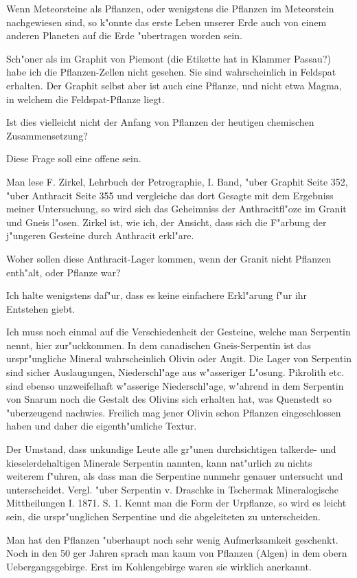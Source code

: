 \documentclass[a4paper, 11pt, oneside, german]{article}
\begin{document}
Wenn Meteorsteine als Pflanzen, oder wenigstens die Pflanzen im Meteorstein nachgewiesen sind, so k"onnte das erste Leben unserer Erde auch von einem anderen Planeten auf die Erde "ubertragen worden sein.

Sch"oner als im Graphit von Piemont (die Etikette hat in Klammer Passau?) habe ich die Pflanzen-Zellen nicht gesehen. Sie sind wahrscheinlich in Feldspat erhalten. Der Graphit selbst aber ist auch eine Pflanze, und nicht etwa Magma, in welchem die Feldspat-Pflanze liegt.

Ist dies vielleicht nicht der Anfang von Pflanzen der heutigen chemischen Zusammensetzung?

Diese Frage soll eine offene sein.

Man lese F. Zirkel, Lehrbuch der Petrographie, I. Band, "uber Graphit Seite 352, "uber Anthracit Seite 355 und vergleiche das dort Gesagte mit dem Ergebniss meiner Untersuchung, so wird sich das Geheimniss der Anthracitfl"oze im Granit und Gneis l"osen. Zirkel ist, wie ich, der Ansicht, dass sich die F"arbung der j"ungeren Gesteine durch Anthracit erkl"are.

Woher sollen diese Anthracit-Lager kommen, wenn der Granit nicht Pflanzen enth"alt, oder Pflanze war?

Ich halte wenigstens daf"ur, dass es keine einfachere Erkl"arung f"ur ihr Entstehen giebt.

Ich muss noch einmal auf die Verschiedenheit der Gesteine, welche man Serpentin nennt, hier zur"uckkommen. In dem canadischen Gneis-Serpentin ist das urspr"ungliche Mineral wahrscheinlich Olivin oder Augit. Die Lager von Serpentin sind sicher Auslaugungen, Niederschl"age aus w"asseriger L"osung. Pikrolith etc. sind ebenso unzweifelhaft w"asserige Niederschl"age, w"ahrend in dem Serpentin von Snarum noch die Gestalt des Olivins sich erhalten hat, was Quenstedt so "uberzeugend nachwies. Freilich mag jener Olivin schon Pflanzen eingeschlossen haben und daher die eigenth"umliche Textur.

Der Umstand, dass unkundige Leute alle gr"unen durchsichtigen talkerde- und kieselerdehaltigen Minerale Serpentin nannten, kann nat"urlich zu nichts weiterem f"uhren, als dass man die Serpentine nunmehr genauer untersucht und unterscheidet. Vergl. "uber Serpentin v. Draschke in Tschermak Mineralogische Mittheilungen I. 1871. S. 1. Kennt man die Form der Urpflanze, so wird es leicht sein, die urspr"unglichen Serpentine und die abgeleiteten zu unterscheiden.

Man hat den Pflanzen "uberhaupt noch sehr wenig Aufmerksamkeit geschenkt. Noch in den 50 ger Jahren sprach man kaum von Pflanzen (Algen) in dem obern Uebergangsgebirge. Erst im Kohlengebirge waren sie wirklich anerkannt.
\end{document}
